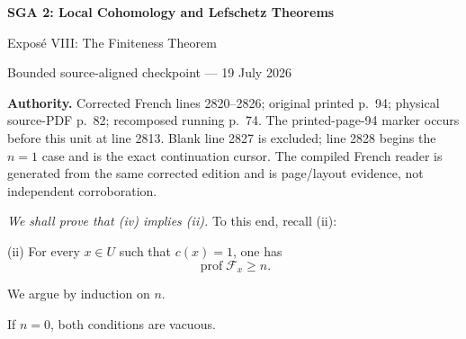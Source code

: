 \documentclass[10pt,a4paper]{article}
\newcommand{\cF}{\mathcal F}
\begin{document}
\begin{center}
  {\Large\bfseries SGA 2: Local Cohomology and Lefschetz Theorems}\par\smallskip
  {\large Expos\'e VIII: The Finiteness Theorem}\par
  \small Bounded source-aligned checkpoint --- 19 July 2026
\end{center}
\noindent\colorbox{softgray}{\parbox{0.95\linewidth}{\footnotesize\textbf{Authority.}
Corrected French lines 2820--2826; original printed p.~94; physical
source-PDF p.~82; recomposed running p.~74. The printed-page-94 marker occurs
before this unit at line 2813. Blank line 2827 is excluded; line 2828 begins
the $n=1$ case and is the exact continuation cursor. The compiled French
reader is generated from the same corrected edition and is page/layout
evidence, not independent corroboration.}}

\medskip
\noindent\textit{We shall prove that \textup{(iv)} implies
\textup{(ii)}.} To this end, recall \textup{(ii)}:

\medskip
\noindent\textup{(ii)} For every $x\in U$ such that $c(x)=1$, one has
\[
  \operatorname{prof}\cF_x\geq n.
\]

\noindent We argue by induction on $n$.

\medskip
\noindent If $n=0$, both conditions are vacuous.
\end{document}
